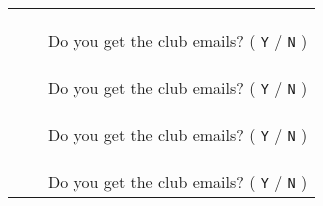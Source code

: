 \documentclass[10pt,letterpaper]{article}
\begin{document}
\begin{center}
\begin{tabular}{|p{5cm}|p{3cm}|p{6cm}|}
  && \\ && \\ && \\ && \small{Do you get the club emails? ( {\large\texttt{Y}} / {\large\texttt{N}} )} \\ \hline
  && \\ && \\ && \\ && \small{Do you get the club emails? ( {\large\texttt{Y}} / {\large\texttt{N}} )} \\ \hline
  && \\ && \\ && \\ && \small{Do you get the club emails? ( {\large\texttt{Y}} / {\large\texttt{N}} )} \\ \hline
  && \\ && \\ && \\ && \small{Do you get the club emails? ( {\large\texttt{Y}} / {\large\texttt{N}} )} \\ \hline
\end{tabular}

\end{center}
\end{document}
